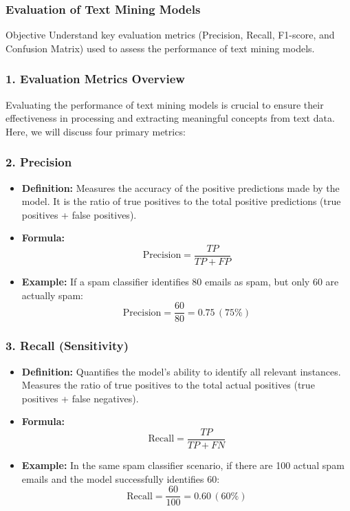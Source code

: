 \documentclass[aspectratio=169]{beamer}
\begin{document}
\begin{frame}[fragile]
    \frametitle{Evaluation of Text Mining Models}
    \begin{block}{Objective}
        Understand key evaluation metrics (Precision, Recall, F1-score, and Confusion Matrix) used to assess the performance of text mining models.
    \end{block}
\end{frame}

\begin{frame}[fragile]
    \frametitle{1. Evaluation Metrics Overview}
    Evaluating the performance of text mining models is crucial to ensure their effectiveness in processing and extracting meaningful concepts from text data. Here, we will discuss four primary metrics:
\end{frame}

\begin{frame}[fragile]
    \frametitle{2. Precision}
    \begin{itemize}
        \item \textbf{Definition:} Measures the accuracy of the positive predictions made by the model. It is the ratio of true positives to the total positive predictions (true positives + false positives).
        \item \textbf{Formula:}  
        \begin{equation}
            \text{Precision} = \frac{TP}{TP + FP}
        \end{equation}
        \item \textbf{Example:} If a spam classifier identifies 80 emails as spam, but only 60 are actually spam:
        \begin{equation}
            \text{Precision} = \frac{60}{80} = 0.75 \, (75\%)
        \end{equation}
    \end{itemize}
\end{frame}

\begin{frame}[fragile]
    \frametitle{3. Recall (Sensitivity)}
    \begin{itemize}
        \item \textbf{Definition:} Quantifies the model's ability to identify all relevant instances. Measures the ratio of true positives to the total actual positives (true positives + false negatives).
        \item \textbf{Formula:}  
        \begin{equation}
            \text{Recall} = \frac{TP}{TP + FN}
        \end{equation}
        \item \textbf{Example:} In the same spam classifier scenario, if there are 100 actual spam emails and the model successfully identifies 60:
        \begin{equation}
            \text{Recall} = \frac{60}{100} = 0.60 \, (60\%)
        \end{equation}
    \end{itemize}
\end{frame}
\end{document}
